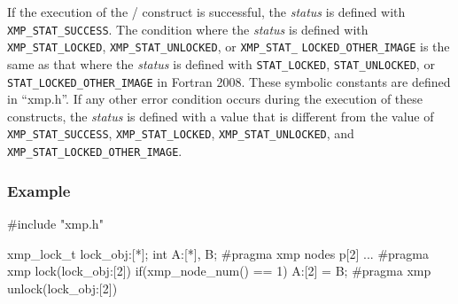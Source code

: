 If the execution of the {\tt {}}/{\tt {}}
construct is successful, 
the {\it status} is defined with {\tt XMP\_STAT\_SUCCESS}.
The condition where the {\it status} is defined with 
{\tt XMP\_STAT\_LOCKED}, {\tt XMP\_STAT\_UNLOCKED}, or {\tt XMP\_STAT\_}
{\tt LOCKED\_OTHER\_IMAGE} 
is the same as that where the {\it status} is defined with
{\tt STAT\_LOCKED}, {\tt STAT\_UNLOCKED}, or {\tt STAT\_LOCKED\_OTHER\_IMAGE} in Fortran 2008.
These symbolic constants are defined in ``xmp.h''.
If any other error condition occurs during the execution of these
constructs, 
the {\it status} is defined with a value that is different from the
value of {\tt XMP\_STAT\_SUCCESS}, {\tt XMP\_STAT\_LOCKED}, 
{\tt XMP\_STAT\_UNLOCKED}, and {\tt XMP\_STAT\_LOCKED\_OTHER\_IMAGE}.


\subsubsection*{Example}
\begin{XCexample}
#include "xmp.h"

xmp_lock_t lock_obj:[*];
int A:[*], B;
#pragma xmp nodes p[2]
...
#pragma xmp lock(lock_obj:[2])
  if(xmp_node_num() == 1){
    A:[2] = B;
  }
#pragma xmp unlock(lock_obj:[2])
\end{XCexample}

